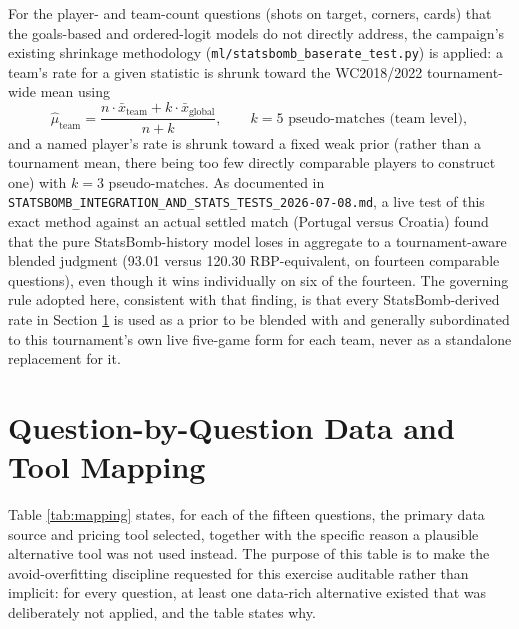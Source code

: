 \documentclass[11pt]{article}
\begin{document}
For the player- and team-count questions (shots on target, corners, cards) that the
goals-based and ordered-logit models do not directly address, the campaign's existing
shrinkage methodology (\texttt{ml/statsbomb\_baserate\_test.py}) is applied: a team's rate
for a given statistic is shrunk toward the WC2018/2022 tournament-wide mean using
\[
\hat\mu_{\text{team}} = \frac{n \cdot \bar x_{\text{team}} + k \cdot \bar x_{\text{global}}}{n + k}, \qquad k = 5 \text{ pseudo-matches (team level)},
\]
and a named player's rate is shrunk toward a fixed weak prior (rather than a tournament
mean, there being too few directly comparable players to construct one) with $k = 3$
pseudo-matches. As documented in
\texttt{STATSBOMB\_INTEGRATION\_AND\_STATS\_TESTS\_2026-07-08.md}, a live test of this
exact method against an actual settled match (Portugal versus Croatia) found that the pure
StatsBomb-history model loses in aggregate to a tournament-aware blended judgment (93.01
versus 120.30 RBP-equivalent, on fourteen comparable questions), even though it wins
individually on six of the fourteen. The governing rule adopted here, consistent with that
finding, is that every StatsBomb-derived rate in Section \ref{sec:questionmapping} is used
as a prior to be blended with and generally subordinated to this tournament's own live
five-game form for each team, never as a standalone replacement for it.

\section{Question-by-Question Data and Tool Mapping}
\label{sec:questionmapping}

Table \ref{tab:mapping} states, for each of the fifteen questions, the primary data source
and pricing tool selected, together with the specific reason a plausible alternative tool
was not used instead. The purpose of this table is to make the avoid-overfitting discipline
requested for this exercise auditable rather than implicit: for every question, at least
one data-rich alternative existed that was deliberately not applied, and the table states
why.
\end{document}
